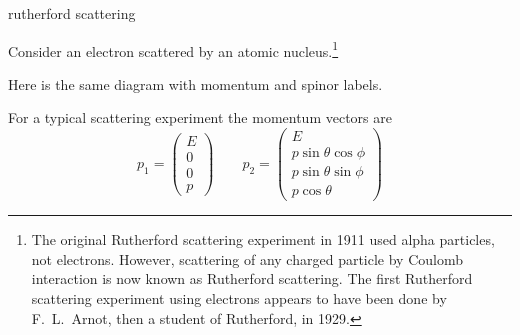 \documentclass[12pt]{article}
\begin{document}
\begin{center}
{\sc rutherford scattering}
\end{center}

\noindent
Consider an electron scattered by an atomic nucleus.\footnote{
The original Rutherford scattering experiment in 1911 used alpha particles, not electrons.
However, scattering of any charged particle by Coulomb interaction
is now known as Rutherford scattering.
The first Rutherford scattering experiment using electrons appears to have
been done by F.~L.~Arnot, then a student of Rutherford, in 1929.}
\begin{center}
\end{center}

\noindent
Here is the same diagram with momentum and spinor labels.
\begin{center}
\end{center}

\noindent
For a typical scattering experiment the momentum vectors are
$$
p_1=\begin{pmatrix}E\\0\\0\\p\end{pmatrix}\qquad
p_2=\begin{pmatrix}
E\\
p\sin\theta\cos\phi\\
p\sin\theta\sin\phi\\
p\cos\theta
\end{pmatrix}
$$
\end{document}
